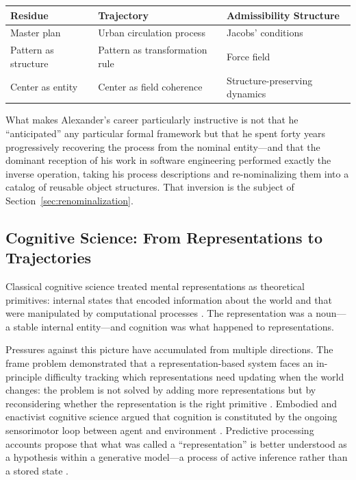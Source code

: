 \documentclass[12pt, a4paper]{article}
\theoremstyle{plain}
\theoremstyle{definition}
\theoremstyle{remark}
\begin{document}
\begin{center}
\begin{tabular}{lll}
\toprule
\textbf{Residue} & \textbf{Trajectory} & \textbf{Admissibility Structure} \\
\midrule
Master plan & Urban circulation process & Jacobs' conditions \\
Pattern as structure & Pattern as transformation rule & Force field \\
Center as entity & Center as field coherence & Structure-preserving dynamics \\
\bottomrule
\end{tabular}
\end{center}

What makes Alexander's career particularly instructive is not that he
``anticipated'' any particular formal framework but that he spent forty years
progressively recovering the process from the nominal entity---and that the
dominant reception of his work in software engineering performed exactly the
inverse operation, taking his process descriptions and re-nominalizing them
into a catalog of reusable object structures. That inversion is the subject
of Section~\ref{sec:renominalization}.

\subsection{Cognitive Science: From Representations to Trajectories}

Classical cognitive science treated mental representations as theoretical
primitives: internal states that encoded information about the world and
that were manipulated by computational processes \citep{fodor1975}.
The representation was a noun---a stable internal entity---and cognition
was what happened to representations.

Pressures against this picture have accumulated from multiple directions.
The frame problem demonstrated that a representation-based system faces an
in-principle difficulty tracking which representations need updating when
the world changes: the problem is not solved by adding more representations
but by reconsidering whether the representation is the right primitive
\citep{hayes1987}. Embodied and enactivist cognitive science argued that
cognition is constituted by the ongoing sensorimotor loop between agent and
environment \citep{varela1991,clark2008}. Predictive processing accounts
propose that what was called a ``representation'' is better understood as a
hypothesis within a generative model---a process of active inference rather
than a stored state \citep{friston2010,clark2013}.
\end{document}
